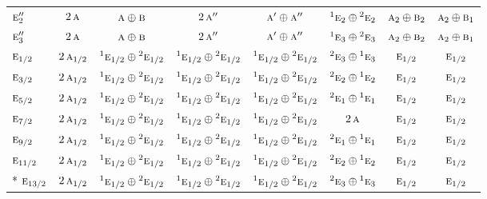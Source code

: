\documentclass[10pt,a4paper]{article}
\numberwithin{equation}{section}
\newcommand{\irr}[1]{\text{\normalfont\scshape #1}}
\newcommand{\conjpair}[1]{{}^{#1}}
\begin{document}
{\begin{longtable}{@{}lccccccc@{}}
$\irr{e}_{2}''$ & $2\,\irr{a}$ & $\irr{a}\oplus \irr{b}$ & $2\,\irr{a}''$ & $\irr{a}'\oplus \irr{a}''$ & $\conjpair{1}\irr{e}_{2}\oplus \conjpair{2}\irr{e}_{2}$ & $\irr{a}_{2}\oplus \irr{b}_{2}$ & $\irr{a}_{2}\oplus \irr{b}_{1}$\\
$\irr{e}_{3}''$ & $2\,\irr{a}$ & $\irr{a}\oplus \irr{b}$ & $2\,\irr{a}''$ & $\irr{a}'\oplus \irr{a}''$ & $\conjpair{1}\irr{e}_{3}\oplus \conjpair{2}\irr{e}_{3}$ & $\irr{a}_{2}\oplus \irr{b}_{2}$ & $\irr{a}_{2}\oplus \irr{b}_{1}$\\
$\irr{e}_{1/2}$ & $2\,\irr{a}_{1/2}$ & $\conjpair{1}\irr{e}_{1/2}\oplus \conjpair{2}\irr{e}_{1/2}$ & $\conjpair{1}\irr{e}_{1/2}\oplus \conjpair{2}\irr{e}_{1/2}$ & $\conjpair{1}\irr{e}_{1/2}\oplus \conjpair{2}\irr{e}_{1/2}$ & $\conjpair{2}\irr{e}_{3}\oplus \conjpair{1}\irr{e}_{3}$ & $\irr{e}_{1/2}$ & $\irr{e}_{1/2}$\\
$\irr{e}_{3/2}$ & $2\,\irr{a}_{1/2}$ & $\conjpair{1}\irr{e}_{1/2}\oplus \conjpair{2}\irr{e}_{1/2}$ & $\conjpair{1}\irr{e}_{1/2}\oplus \conjpair{2}\irr{e}_{1/2}$ & $\conjpair{1}\irr{e}_{1/2}\oplus \conjpair{2}\irr{e}_{1/2}$ & $\conjpair{2}\irr{e}_{2}\oplus \conjpair{1}\irr{e}_{2}$ & $\irr{e}_{1/2}$ & $\irr{e}_{1/2}$\\
$\irr{e}_{5/2}$ & $2\,\irr{a}_{1/2}$ & $\conjpair{1}\irr{e}_{1/2}\oplus \conjpair{2}\irr{e}_{1/2}$ & $\conjpair{1}\irr{e}_{1/2}\oplus \conjpair{2}\irr{e}_{1/2}$ & $\conjpair{1}\irr{e}_{1/2}\oplus \conjpair{2}\irr{e}_{1/2}$ & $\conjpair{2}\irr{e}_{1}\oplus \conjpair{1}\irr{e}_{1}$ & $\irr{e}_{1/2}$ & $\irr{e}_{1/2}$\\
$\irr{e}_{7/2}$ & $2\,\irr{a}_{1/2}$ & $\conjpair{1}\irr{e}_{1/2}\oplus \conjpair{2}\irr{e}_{1/2}$ & $\conjpair{1}\irr{e}_{1/2}\oplus \conjpair{2}\irr{e}_{1/2}$ & $\conjpair{1}\irr{e}_{1/2}\oplus \conjpair{2}\irr{e}_{1/2}$ & $2\,\irr{a}$ & $\irr{e}_{1/2}$ & $\irr{e}_{1/2}$\\
$\irr{e}_{9/2}$ & $2\,\irr{a}_{1/2}$ & $\conjpair{1}\irr{e}_{1/2}\oplus \conjpair{2}\irr{e}_{1/2}$ & $\conjpair{1}\irr{e}_{1/2}\oplus \conjpair{2}\irr{e}_{1/2}$ & $\conjpair{1}\irr{e}_{1/2}\oplus \conjpair{2}\irr{e}_{1/2}$ & $\conjpair{2}\irr{e}_{1}\oplus \conjpair{1}\irr{e}_{1}$ & $\irr{e}_{1/2}$ & $\irr{e}_{1/2}$\\
$\irr{e}_{11/2}$ & $2\,\irr{a}_{1/2}$ & $\conjpair{1}\irr{e}_{1/2}\oplus \conjpair{2}\irr{e}_{1/2}$ & $\conjpair{1}\irr{e}_{1/2}\oplus \conjpair{2}\irr{e}_{1/2}$ & $\conjpair{1}\irr{e}_{1/2}\oplus \conjpair{2}\irr{e}_{1/2}$ & $\conjpair{2}\irr{e}_{2}\oplus \conjpair{1}\irr{e}_{2}$ & $\irr{e}_{1/2}$ & $\irr{e}_{1/2}$\\*
$\irr{e}_{13/2}$ & $2\,\irr{a}_{1/2}$ & $\conjpair{1}\irr{e}_{1/2}\oplus \conjpair{2}\irr{e}_{1/2}$ & $\conjpair{1}\irr{e}_{1/2}\oplus \conjpair{2}\irr{e}_{1/2}$ & $\conjpair{1}\irr{e}_{1/2}\oplus \conjpair{2}\irr{e}_{1/2}$ & $\conjpair{2}\irr{e}_{3}\oplus \conjpair{1}\irr{e}_{3}$ & $\irr{e}_{1/2}$ & $\irr{e}_{1/2}$\\
\bottomrule\end{longtable}}
\end{document}
